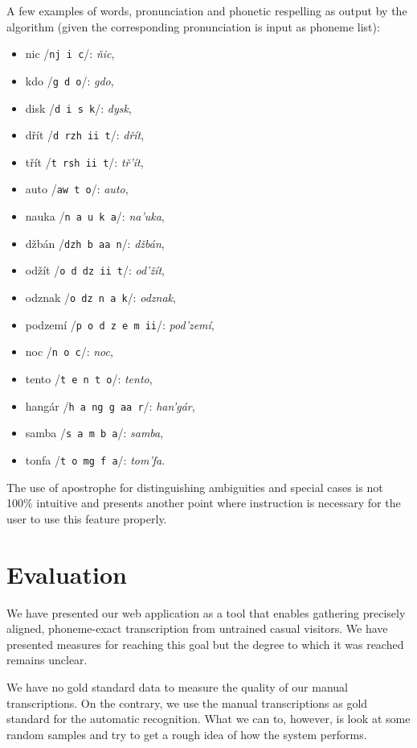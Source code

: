\documentclass{itatnew}
\begin{document}
A few examples of words, pronunciation and phonetic respelling as output by the
algorithm (given the corresponding pronunciation is input as phoneme list):
\begin{itemize}
\item{nic /\texttt{nj i c}/: {\em ňic},}
\item{kdo /\texttt{g d o}/: {\em gdo},}
\item{disk /\texttt{d i s k}/: {\em dysk},}
\item{dřít /\texttt{d rzh ii t}/: {\em dřít},}
\item{třít /\texttt{t rsh ii t}/: {\em tř'ít},}
\item{auto /\texttt{aw t o}/: {\em auto},}
\item{nauka /\texttt{n a u k a}/: {\em na'uka},}
\item{džbán /\texttt{dzh b aa n}/: {\em džbán},}
\item{odžít /\texttt{o d dz ii t}/: {\em od'žít},}
\item{odznak /\texttt{o dz n a k}/: {\em odznak},}
\item{podzemí /\texttt{p o d z e m ii}/: {\em pod'zemí},}
\item{noc /\texttt{n o c}/: {\em noc},}
\item{tento /\texttt{t e n t o}/: {\em tento},}
\item{hangár /\texttt{h a ng g aa r}/: {\em han'gár},}
\item{samba /\texttt{s a m b a}/: {\em samba},}
\item{tonfa /\texttt{t o mg f a}/: {\em tom'fa}.}
\end{itemize}

The use of apostrophe for distinguishing ambiguities and special cases is
not 100\% intuitive and presents another point where instruction is necessary
for the user to use this feature properly.

\section{Evaluation}

We have presented our web application as a tool that enables gathering precisely
aligned, phoneme-exact transcription from untrained casual visitors. We have
presented measures for reaching this goal but the degree to which it was reached
remains unclear.

We have no gold standard data to measure the quality of our manual
transcriptions. On the contrary, we use the manual transcriptions as gold
standard for the automatic recognition. What we can to, however, is look at some
random samples and try to get a rough idea of how the system performs.
\end{document}
